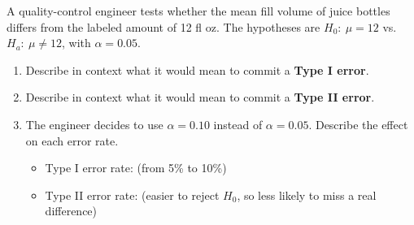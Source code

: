 \documentclass[10pt]{article}
\begin{document}
\namedateperiod

\vspace{0.1in}
A quality-control engineer tests whether the mean fill volume of juice bottles differs
from the labeled amount of 12 fl oz. The hypotheses are $H_0{:}\ \mu = 12$ vs.\
$H_a{:}\ \mu \ne 12$, with $\alpha = 0.05$.

\begin{enumerate}

  \item Describe in context what it would mean to commit a \textbf{Type I error}.


  \item Describe in context what it would mean to commit a \textbf{Type II error}.


  \item The engineer decides to use $\alpha = 0.10$ instead of $\alpha = 0.05$.
        Describe the effect on each error rate.

        \begin{itemize}
            \item Type I error rate:  (from 5\% to 10\%)
            \item Type II error rate: \ans{decreases} (easier to reject $H_0$, so less likely to miss a real difference)
        \end{itemize}

\end{enumerate}
\end{document}
